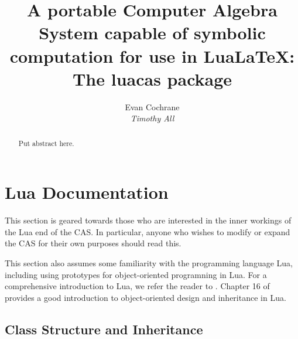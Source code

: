 \documentclass{article}
\begin{document}
\title{A portable Computer Algebra System capable of symbolic computation for use in Lua\LaTeX{}: \\  The {\ttfamily luacas} package }
\author{Evan Cochrane \\ {\itshape Timothy All}}
\date{} 

\maketitle 

\begin{abstract}
    Put abstract here. 
\end{abstract}

\tableofcontents

















 

 

\appendix


    
\section{Lua Documentation}

This section is geared towards those who are interested in the inner workings of the Lua end of the CAS. In particular, anyone who wishes to modify or expand the CAS for their own purposes should read this.
 
This section also assumes some familiarity with the programming language Lua, including using prototypes for object-oriented programning in Lua. For a comprehensive introduction to Lua, we refer the reader to \cite{pil}. Chapter 16 of \cite{pil} provides a good introduction to object-oriented design and inheritance in Lua. 
 
 \subsection{Class Structure and Inheritance}
 
\end{document}
